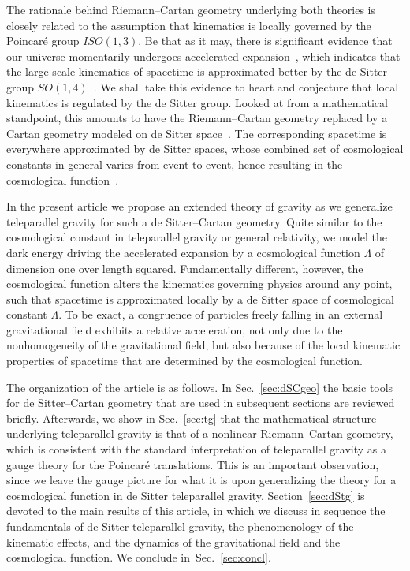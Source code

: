 \documentclass[%
aps,
prd,
reprint
]{revtex4-1}
\begin{document}
The rationale behind Riemann--Cartan geometry underlying both 
theories is closely related to the assumption that kinematics is 
locally governed by the Poincar\'e group $ISO(1,3)$. Be that as 
it may, there is significant evidence that our universe 
momentarily undergoes accelerated expansion~\cite{Peebles:2003cc, 
  Weinberg:2008bc}, which indicates that the large-scale 
kinematics of spacetime is approximated better by the de Sitter 
group $SO(1,4)$~\cite{Aldrovandi:2006vr}. We shall take this 
evidence to heart and conjecture that local kinematics is 
regulated by the de Sitter group. Looked at from a mathematical 
standpoint, this amounts to have the Riemann--Cartan geometry 
replaced by a Cartan geometry modeled on de Sitter 
space~\cite{Wise:2010sm}. The corresponding spacetime is 
everywhere approximated by de Sitter spaces, whose combined set 
of cosmological constants in general varies from event to event, 
hence resulting in the cosmological 
function~\cite{Jennen:2014mba}.

In the present article we propose an extended theory of gravity 
as we generalize teleparallel gravity for such a de 
Sitter--Cartan geometry. Quite similar to the cosmological 
constant in teleparallel gravity or general relativity, we model 
the dark energy driving the accelerated expansion by 
a cosmological function $\Lambda$ of dimension one over length 
squared. Fundamentally different, however, the cosmological 
function alters the kinematics governing physics around any 
point, such that spacetime is approximated locally by a de Sitter 
space of cosmological constant $\Lambda$. To be exact, 
a congruence of particles freely falling in an external 
gravitational field exhibits a relative acceleration, not only 
due to the nonhomogeneity of the gravitational field, but also 
because of the local kinematic properties of spacetime that are 
determined by the cosmological function.

The organization of the article is as follows. In 
Sec.~\ref{sec:dSCgeo} the basic tools for de Sitter--Cartan 
geometry that are used in subsequent sections are reviewed 
briefly. Afterwards, we show in Sec.~\ref{sec:tg} that the 
mathematical structure underlying teleparallel gravity is that of 
a nonlinear Riemann--Cartan geometry, which is consistent with 
the standard interpretation of teleparallel gravity as a gauge 
theory for the Poincar\'e translations. This is an important 
observation, since we leave the gauge picture for what it is upon 
generalizing the theory for a cosmological function in de Sitter 
teleparallel gravity. Section~\ref{sec:dStg} is devoted to the 
main results of this article, in which we discuss in sequence the 
fundamentals of de Sitter teleparallel gravity, the phenomenology 
of the kinematic effects, and the dynamics of the gravitational 
field and the cosmological function. We conclude 
in~Sec.~\ref{sec:concl}.
\end{document}
